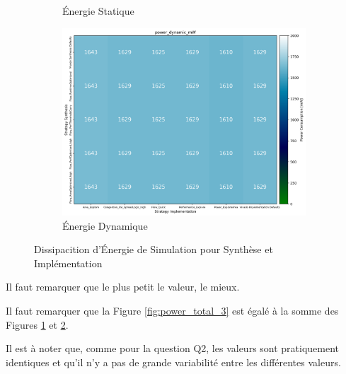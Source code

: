 \documentclass[../CSC_5RO07_TA.tex]{subfiles}
\begin{document}
\begin{figure}[h]
\begin{subfigure}[b]{0.30\textwidth}
        \caption{Énergie Statique}
        \label{fig:power_static_3}
    \end{subfigure}\hfill
    \begin{subfigure}[b]{0.30\textwidth}
        \centering
        \includegraphics[width=\linewidth]{images/3_power_dynamic_mW.png}
        \caption{Énergie Dynamique}
        \label{fig:power_dynamic_3}
    \end{subfigure}
    \caption{Dissipacition d'Énergie de Simulation pour Synthèse et Implémentation}
    \label{fig:power_3}
\end{figure}
\begin{remark}
    Il faut remarquer que le plus petit le valeur, le mieux.
\end{remark}
\begin{remark}
    Il faut remarquer que la Figure \ref{fig:power_total_3} est égalé à la somme des Figures \ref{fig:power_static_3} et \ref{fig:power_dynamic_3}.
\end{remark}
\noindent Il est à noter que, comme pour la question Q2, les valeurs sont pratiquement identiques et qu'il n'y a pas de grande variabilité entre les différentes valeurs.\\
\end{document}
